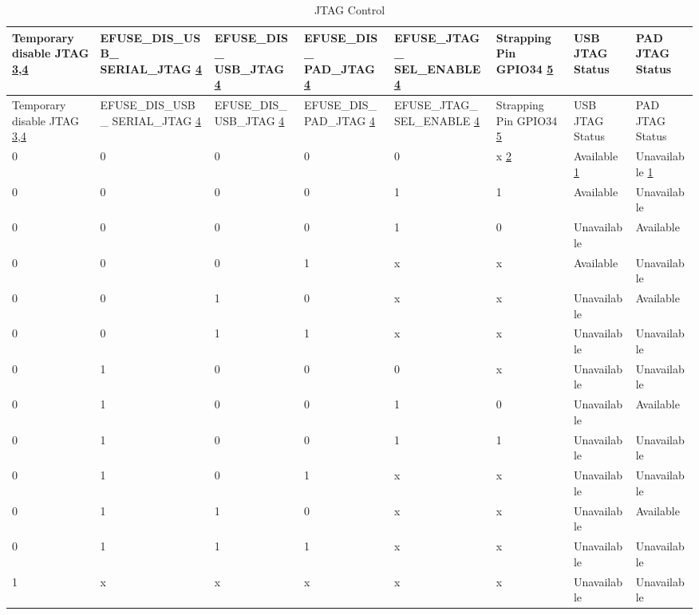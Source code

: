 \begin{longtable}{ | p{1.5cm} | p{2.6cm} | p{1.9cm} | p{1.9cm} | p{2.1cm} | p{1.4cm} | p{1.6cm} | p{1.6cm} | }
\caption{JTAG Control} \label{tab:riscvcpu-jtag-control}\\
\hline\rowcolor{lightgray}
Temporary disable JTAG \hyperref[JTAG footnote: 3]{3},\hyperref[JTAG footnote: 4]{4} & EFUSE\_DIS\_USB\_ SERIAL\_JTAG \hyperref[JTAG footnote: 4]{4} & EFUSE\_DIS\_ USB\_JTAG \hyperref[JTAG footnote: 4]{4} & EFUSE\_DIS\_ PAD\_JTAG \hyperref[JTAG footnote: 4]{4} & EFUSE\_JTAG\_ SEL\_ENABLE \hyperref[JTAG footnote: 4]{4} & Strapping Pin GPIO34 \hyperref[JTAG footnote: 5]{5} & USB JTAG Status & PAD JTAG Status \\ \hline
\endfirsthead
\hline
\rowcolor{lightgray}
Temporary disable JTAG \hyperref[JTAG footnote: 3]{3},\hyperref[JTAG footnote: 4]{4} & EFUSE\_DIS\_USB\_ SERIAL\_JTAG \hyperref[JTAG footnote: 4]{4} & EFUSE\_DIS\_ USB\_JTAG \hyperref[JTAG footnote: 4]{4} & EFUSE\_DIS\_ PAD\_JTAG \hyperref[JTAG footnote: 4]{4} & EFUSE\_JTAG\_ SEL\_ENABLE \hyperref[JTAG footnote: 4]{4} & Strapping Pin GPIO34 \hyperref[JTAG footnote: 5]{5} & USB JTAG Status & PAD JTAG Status \\ \hline
\hline
\endhead
\endfoot

0 & 0 & 0 & 0 & 0 & x \hyperref[JTAG footnote: 2]{2}	& Available	 \hyperref[JTAG footnote: 1]{1}  &     Unavailable  \hyperref[JTAG footnote: 1]{1}  \\\hline
0 & 0 & 0 & 0 & 1 & 1	& Available	  &     Unavailable   \\\hline
0 & 0 & 0 & 0 & 1 & 0	& Unavailable & 	Available \\\hline
0 & 0 & 0 & 1 & x & x	& Available   & 	Unavailable \\\hline
0 & 0 & 1 & 0 & x & x	& Unavailable & 	Available \\\hline
0 & 0 & 1 & 1 & x & x	& Unavailable & 	Unavailable \\\hline
0 & 1 & 0 & 0 & 0 & x	& Unavailable & 	Unavailable \\\hline
0 & 1 & 0 & 0 & 1 & 0	& Unavailable & 	Available \\\hline
0 & 1 & 0 & 0 & 1 & 1	& Unavailable & 	Unavailable \\\hline
0 & 1 & 0 & 1 & x & x	& Unavailable & 	Unavailable \\\hline
0 & 1 & 1 & 0 & x & x	& Unavailable & 	Available \\\hline
0 & 1 & 1 & 1 & x & x	& Unavailable & 	Unavailable \\\hline
1 & x & x & x & x & x	& Unavailable & 	Unavailable \\\hline

\end{longtable}

